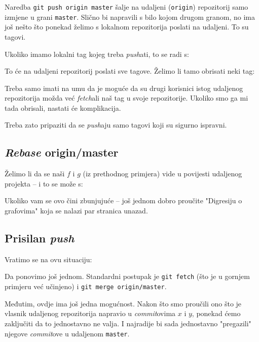 Naredba \verb+git push origin master+ šalje na udaljeni (\verb+origin+) repozitorij samo izmjene u grani \verb+master+.
Slično bi napravili s bilo kojom drugom granom, no ima još nešto što ponekad želimo s lokalnom repozitorija poslati na udaljeni.
To su tagovi.

Ukoliko imamo lokalni tag kojeg treba \emph{push}ati, to se radi s:


To će na udaljeni repozitorij poslati sve tagove.
Želimo li tamo obrisati neki tag:


Treba samo imati na umu da je moguće da su drugi korisnici istog udaljenog repozitorija možda već \emph{fetch}ali naš tag u svoje repozitorije.
Ukoliko smo ga mi tada obrisali, nastati će komplikacija.

Treba zato pripaziti da se \emph{push}aju samo tagovi koji su sigurno ispravni.

\subsection*{\emph{Rebase} origin/master}

Želimo li da se naši $f$ i $g$ (iz prethodnog primjera) vide u povijesti udaljenog projekta -- i to se može s:


Ukoliko vam se ovo čini zbunjujuće -- još jednom dobro proučite "Digresiju o grafovima" koja se nalazi par stranica unazad.

\subsection*{Prisilan \emph{push}}

Vratimo se na ovu situaciju:



Da ponovimo još jednom.
Standardni postupak je \verb+git fetch+ (što je u gornjem primjeru već učinjeno) i \verb+git merge origin/master+.

Međutim, ovdje ima još jedna mogućnost.
Nakon što smo proučili ono što je vlasnik udaljenog repozitorija napravio u \emph{commit}ovima $x$ i $y$, ponekad ćemo zaključiti da to jednostavno ne valja. 
I najradije bi sada jednostavno "pregazili" njegove \emph{commit}ove u udaljenom \verb+master+.

